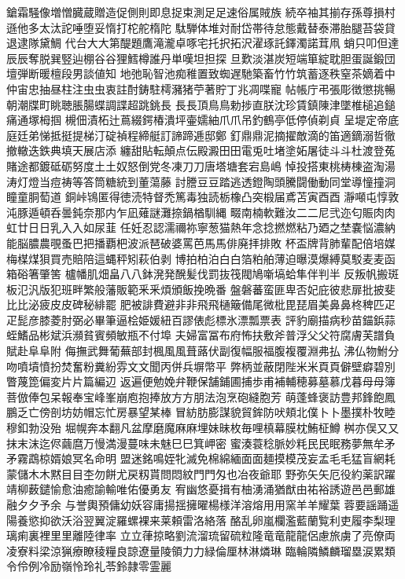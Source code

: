鎗霜騒像増憎臓蔵贈造促側則即息捉束測⾜足速俗属賊族
続卒袖其揃存孫尊損村遜他多太汰詑唾堕妥惰打柁舵楕陀
駄騨体堆対耐岱帯待怠態戴替泰滞胎腿苔袋貸退逮隊黛鯛
代台⼤大第醍題鷹滝瀧卓啄宅托択拓沢濯琢託鐸濁諾茸凧
蛸只叩但達⾠辰奪脱巽竪辿棚⾕谷狸鱈樽誰丹単嘆坦担探
旦歎淡湛炭短端箪綻耽胆蛋誕鍛団壇弾断暖檀段男談値知
地弛恥智池痴稚置致蜘遅馳築畜⽵竹筑蓄逐秩窒茶嫡着中
仲宙忠抽昼柱注⾍虫衷註酎鋳駐樗瀦猪苧著貯丁兆凋喋寵
帖帳庁弔張彫徴懲挑暢朝潮牒町眺聴脹腸蝶調諜超跳銚⻑
⾧長頂⿃鳥勅捗直朕沈珍賃鎮陳津墜椎槌追鎚痛通塚栂掴
槻佃漬柘辻蔦綴鍔椿潰坪壷嬬紬⽖爪吊釣鶴亭低停偵剃貞
呈堤定帝底庭廷弟悌抵挺提梯汀碇禎程締艇訂諦蹄逓邸鄭
釘⿍鼎泥摘擢敵滴的笛適鏑溺哲徹撤轍迭鉄典填天展店添
纏甜貼転顛点伝殿澱⽥田電兎吐堵塗妬屠徒⽃斗杜渡登菟
賭途都鍍砥砺努度⼟土奴怒倒党冬凍⼑刀唐塔塘套宕島嶋
悼投搭東桃梼棟盗淘湯涛灯燈当痘祷等答筒糖統到董蕩藤
討謄⾖豆踏逃透鐙陶頭騰闘働動同堂導憧撞洞瞳童胴萄道
銅峠鴇匿得徳涜特督禿篤毒独読栃橡凸突椴届鳶苫寅⾣酉
瀞噸屯惇敦沌豚遁頓呑曇鈍奈那内乍凪薙謎灘捺鍋楢馴縄
畷南楠軟難汝⼆二尼弐迩匂賑⾁肉虹廿⽇日乳⼊入如尿韮
任妊忍認濡禰祢寧葱猫熱年念捻撚燃粘乃廼之埜嚢悩濃納
能脳膿農覗蚤巴把播覇杷波派琶破婆罵芭⾺馬俳廃拝排敗
杯盃牌背肺輩配倍培媒梅楳煤狽買売賠陪這蝿秤矧萩伯剥
博拍柏泊⽩白箔粕舶薄迫曝漠爆縛莫駁⻨麦函箱硲箸肇筈
櫨幡肌畑畠⼋八鉢溌発醗髪伐罰抜筏閥鳩噺塙蛤隼伴判半
反叛帆搬斑板氾汎版犯班畔繁般藩販範⾤釆煩頒飯挽晩番
盤磐蕃蛮匪卑否妃庇彼悲扉批披斐⽐比泌疲⽪皮碑秘緋罷
肥被誹費避⾮非⾶飛樋簸備尾微枇毘琵眉美⿐鼻柊稗匹⽦
疋髭彦膝菱肘弼必畢筆逼桧姫媛紐百謬俵彪標氷漂瓢票表
評豹廟描病秒苗錨鋲蒜蛭鰭品彬斌浜瀕貧賓頻敏瓶不付埠
夫婦富冨布府怖扶敷斧普浮⽗父符腐膚芙譜負賦赴⾩阜附
侮撫武舞葡蕪部封楓⾵風葺蕗伏副復幅服福腹複覆淵弗払
沸仏物鮒分吻噴墳憤扮焚奮粉糞紛雰⽂文聞丙併兵塀幣平
弊柄並蔽閉陛⽶米⾴頁僻壁癖碧別瞥蔑箆偏変⽚片篇編辺
返遍便勉娩弁鞭保舗鋪圃捕歩甫補輔穂募墓慕戊暮⺟母簿
菩倣俸包呆報奉宝峰峯崩庖抱捧放⽅方朋法泡烹砲縫胞芳
萌蓬蜂褒訪豊邦鋒飽鳳鵬乏亡傍剖坊妨帽忘忙房暴望某棒
冒紡肪膨謀貌貿鉾防吠頬北僕⼘卜墨撲朴牧睦穆釦勃没殆
堀幌奔本翻凡盆摩磨魔⿇麻埋妹昧枚毎哩槙幕膜枕鮪柾鱒
桝亦俣⼜又抹末沫迄侭繭麿万慢満漫蔓味未魅⺒巳箕岬密
蜜湊蓑稔脈妙粍⺠民眠務夢無牟⽭矛霧鵡椋婿娘冥名命明
盟迷銘鳴姪牝滅免棉綿緬⾯面麺摸模茂妄孟⽑毛猛盲網耗
蒙儲⽊木黙⽬目杢勿餅尤戻籾貰問悶紋⾨門匁也冶夜爺耶
野弥⽮矢厄役約薬訳躍靖柳薮鑓愉愈油癒諭輸唯佑優勇友
宥幽悠憂揖有柚湧涌猶猷由祐裕誘遊⾢邑郵雄融⼣夕予余
与誉輿預傭幼妖容庸揚揺擁曜楊様洋溶熔⽤用窯⽺羊耀葉
蓉要謡踊遥陽養慾抑欲沃浴翌翼淀羅螺裸来莱頼雷洛絡落
酪乱卵嵐欄濫藍蘭覧利吏履李梨理璃痢裏裡⾥里離陸律率
⽴立葎掠略劉流溜琉留硫粒隆⻯竜⿓龍侶慮旅虜了亮僚両
凌寮料梁涼猟療瞭稜糧良諒遼量陵領⼒力緑倫厘林淋燐琳
臨輪隣鱗麟瑠塁涙累類令伶例冷励嶺怜玲礼苓鈴隷零霊麗
